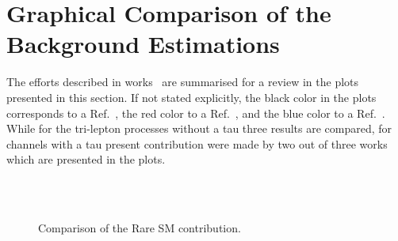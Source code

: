 \newpage
\appendix
\section{Graphical Comparison of the Background Estimations}
\label{app:graphical}
The efforts described in works~\cite{AN2012:248,AN2012:255,AN2012:256} are summarised for 
a review in the plots presented in this section. If not stated explicitly, the black color in the plots corresponds to 
a Ref.~\cite{AN2012:248}, the red color to a Ref.~\cite{AN2012:255}, and the blue color to a Ref.~\cite{AN2012:256}.
While for the tri-lepton processes without a tau three results are compared, for channels with a tau present
contribution were made by two out of three works which are presented in the plots.
\begin{figure}[htp]
\begin{center}
 \\
 \\
\caption{Comparison of the Rare SM contribution.}
\label{fig:rare1}
\end{center}
\end{figure}
